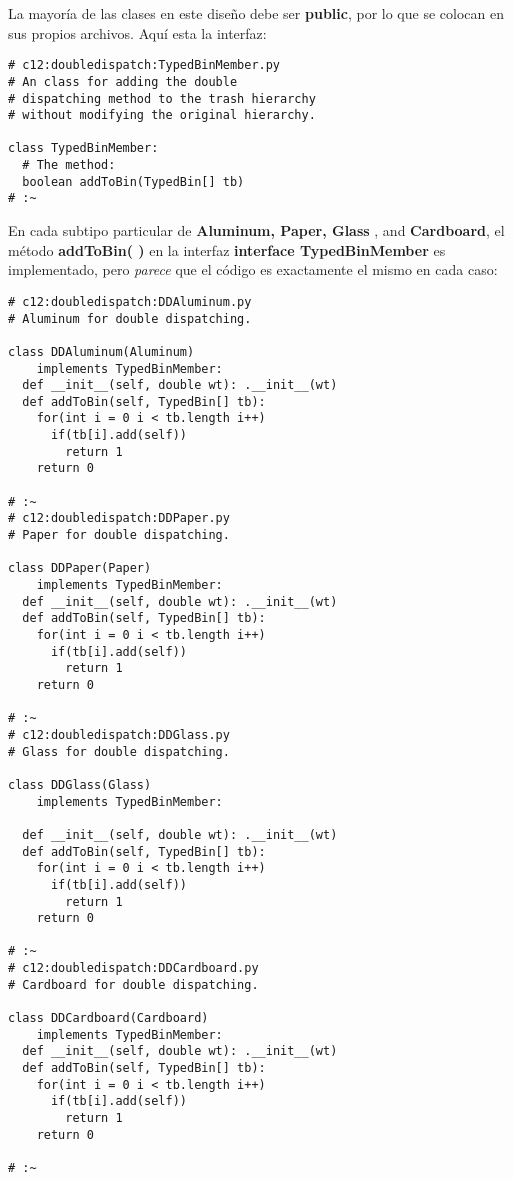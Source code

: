 La mayoría de las clases en este diseño debe ser \textbf{public}, por lo que se colocan en sus propios archivos. Aquí esta la interfaz:     \newline

\begin{lstlisting} 
# c12:doubledispatch:TypedBinMember.py 
# An class for adding the double  
# dispatching method to the trash hierarchy  
# without modifying the original hierarchy.

class TypedBinMember: 
  # The method: 
  boolean addToBin(TypedBin[] tb) 
# :~ 
\end{lstlisting}

En cada subtipo particular de \textbf{Aluminum, Paper, Glass} , and \textbf{Cardboard}, el método \textbf{addToBin( )} en la interfaz \textbf{interface TypedBinMember} es implementado, pero \textit{parece}  que el código es exactamente el mismo en cada caso:    \newline

\begin{lstlisting} 
# c12:doubledispatch:DDAluminum.py 
# Aluminum for double dispatching. 

class DDAluminum(Aluminum)  
    implements TypedBinMember: 
  def __init__(self, double wt): .__init__(wt)  
  def addToBin(self, TypedBin[] tb): 
    for(int i = 0 i < tb.length i++) 
      if(tb[i].add(self)) 
        return 1 
    return 0 
    
# :~ 
# c12:doubledispatch:DDPaper.py 
# Paper for double dispatching. 

class DDPaper(Paper)  
    implements TypedBinMember: 
  def __init__(self, double wt): .__init__(wt)  
  def addToBin(self, TypedBin[] tb): 
    for(int i = 0 i < tb.length i++) 
      if(tb[i].add(self)) 
        return 1 
    return 0 
    
# :~ 
# c12:doubledispatch:DDGlass.py 
# Glass for double dispatching. 

class DDGlass(Glass)  
    implements TypedBinMember: 

  def __init__(self, double wt): .__init__(wt)  
  def addToBin(self, TypedBin[] tb): 
    for(int i = 0 i < tb.length i++) 
      if(tb[i].add(self)) 
        return 1 
    return 0 
    
# :~ 
# c12:doubledispatch:DDCardboard.py 
# Cardboard for double dispatching. 

class DDCardboard(Cardboard)  
    implements TypedBinMember: 
  def __init__(self, double wt): .__init__(wt)  
  def addToBin(self, TypedBin[] tb): 
    for(int i = 0 i < tb.length i++) 
      if(tb[i].add(self)) 
        return 1 
    return 0 
    
# :~ 
\end{lstlisting}

